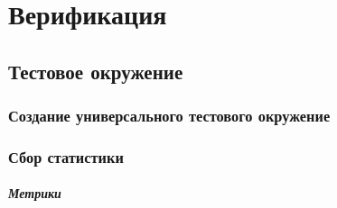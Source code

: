 
\chapter{Верификация}

\section{Тестовое окружение}

\subsection{Создание универсального тестового окружение}

\subsection{Сбор статистики}

\paragraph{Метрики}

\clearpage

